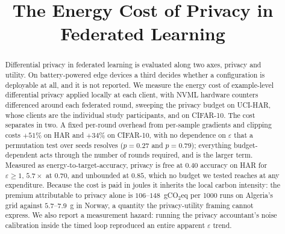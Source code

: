 \documentclass[conference]{IEEEtran}
\begin{document}
\title{\textbf{The Energy Cost of Privacy in Federated Learning}}

\author{%
\and
{}
\and
{}
}

\maketitle


\begin{abstract}
Differential privacy in federated learning is evaluated along two axes,
privacy and utility. On battery-powered edge devices a third decides whether a
configuration is deployable at all, and it is not reported. We measure the
energy cost of example-level differential privacy applied locally at each
client, with NVML hardware counters differenced around each federated round,
sweeping the privacy budget on UCI-HAR, whose clients are the individual study
participants, and on CIFAR-10.
The cost separates in two. A fixed per-round overhead from per-sample
gradients and clipping costs $+51\%$ on HAR and $+34\%$ on CIFAR-10, with no
dependence on $\varepsilon$ that a permutation test over seeds resolves
($p = 0.27$ and $p = 0.79$); everything budget-dependent acts through the
number of rounds required, and is the larger term. Measured as
energy-to-target-accuracy, privacy is free at $0.40$ accuracy on HAR for $\varepsilon \geq 1$,
$5.7\times$ at $0.70$, and unbounded at $0.85$, which no budget we tested
reaches at any expenditure. Because the cost is paid in joules it inherits the
local carbon intensity: the premium attributable to privacy alone is
$106$--$148$~gCO$_2$eq per 1000 runs on Algeria's grid against $5.7$--$7.9$~g
in Norway, a quantity the privacy-utility framing cannot express. We also report a measurement hazard:
running the privacy accountant's noise calibration inside the timed loop
reproduced an entire apparent $\varepsilon$ trend.
\end{abstract}
\end{document}
